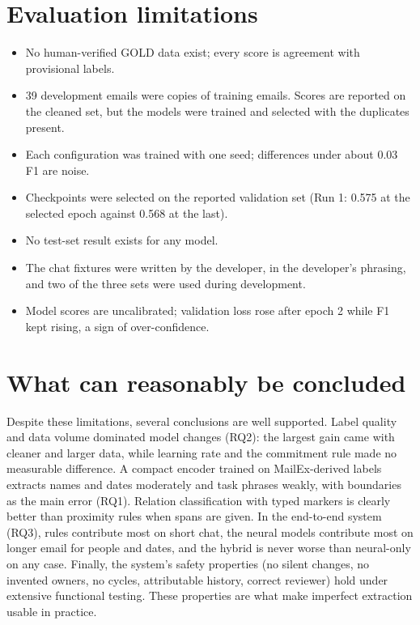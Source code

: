 \section{Evaluation limitations}
\begin{itemize}
  \item No human-verified GOLD data exist; every score is agreement with provisional labels.
  \item 39 development emails were copies of training emails. Scores are reported on the cleaned set, but the models were trained and selected with the duplicates present.
  \item Each configuration was trained with one seed; differences under about 0.03 F1 are noise.
  \item Checkpoints were selected on the reported validation set (Run 1: 0.575 at the selected epoch against 0.568 at the last).
  \item No test-set result exists for any model.
  \item The chat fixtures were written by the developer, in the developer's phrasing, and two of the three sets were used during development.
  \item Model scores are uncalibrated; validation loss rose after epoch 2 while F1 kept rising, a sign of over-confidence.
\end{itemize}

\section{What can reasonably be concluded}
Despite these limitations, several conclusions are well supported. Label quality and data volume dominated model changes (RQ2): the largest gain came with cleaner and larger data, while learning rate and the commitment rule made no measurable difference. A compact encoder trained on MailEx-derived labels extracts names and dates moderately and task phrases weakly, with boundaries as the main error (RQ1). Relation classification with typed markers is clearly better than proximity rules when spans are given. In the end-to-end system (RQ3), rules contribute most on short chat, the neural models contribute most on longer email for people and dates, and the hybrid is never worse than neural-only on any case. Finally, the system's safety properties (no silent changes, no invented owners, no cycles, attributable history, correct reviewer) hold under extensive functional testing. These properties are what make imperfect extraction usable in practice.

